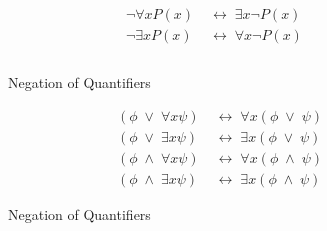 

\begin{figure}[ht!]
\centering
\begin{minipage}{.5\textwidth}
\begin{center}
\begin{align*}
    \lnot\forall{x}P(x)\;&\leftrightarrow\;\exists{x}\lnot{P(x)}\\
    \lnot\exists{x}P(x)\;&\leftrightarrow\;\forall{x}\lnot{P(x)}
    &\\
    &\\
    &
\end{align*}
\end{center}
\caption{Negation of Quantifiers}
\label{fig:demequivalencerules}
\end{minipage}%
\begin{minipage}{.5\textwidth}
\begin{center}
    \begin{align*}
    (\phi\;\lor\;\forall{x}\psi)\;&\leftrightarrow\;\forall{x}(\phi\;\lor\;\psi)\\
    (\phi\;\lor\;\exists{x}\psi)\;&\leftrightarrow\;\exists{x}(\phi\;\lor\;\psi)\\
    (\phi\;\land\;\forall{x}\psi)\;&\leftrightarrow\;\forall{x}(\phi\;\land\;\psi)\\
    (\phi\;\land\;\exists{x}\psi)\;&\leftrightarrow\;\exists{x}(\phi\;\land\;\psi)
\end{align*}
\end{center}
\caption{Negation of Quantifiers}
\label{fig:quantifierequivalencerules}
\end{minipage}
\end{figure}

